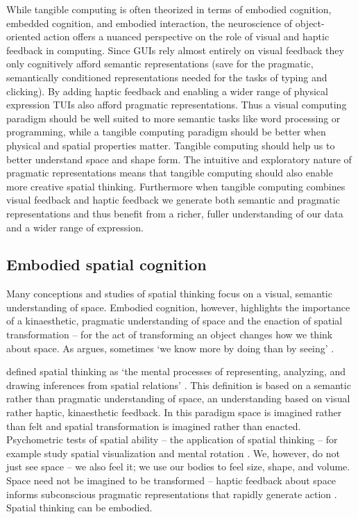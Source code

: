 \documentclass{article}
\begin{document}
While tangible computing is often theorized in terms of embodied cognition, embedded cognition, and embodied interaction,
the neuroscience of object-oriented action offers a nuanced perspective on the role of visual and haptic feedback in computing.
Since GUIs rely almost entirely on visual feedback they only cognitively afford semantic representations (save for the pragmatic, semantically conditioned representations needed for the tasks of typing and clicking). 
By adding haptic feedback and enabling a wider range of physical expression TUIs also afford pragmatic representations. 
Thus a visual computing paradigm should be well suited to more semantic tasks like word processing or programming, while a tangible computing paradigm should be better 
when physical and spatial properties matter. 
Tangible computing should help us to better understand space and shape form. 
The intuitive and exploratory nature of pragmatic representations means that tangible computing should also enable more creative spatial thinking. 
Furthermore when tangible computing combines visual feedback and haptic feedback
we generate both semantic and pragmatic representations and thus benefit from a richer, fuller understanding of our data and a wider range of expression.

\subsection{Embodied spatial cognition}
Many conceptions and studies of spatial thinking focus on a visual, semantic understanding of space. 
Embodied cognition, however, highlights the importance of a kinaesthetic, pragmatic understanding of space
and the enaction of spatial transformation -- for the act of transforming an object changes how we think about space. 
As \citeauthor{Kirsh2013} argues, sometimes `we know more by doing than by seeing' \citeyearpar{Kirsh2013}.

\citeauthor{Uttal2013} defined spatial thinking as 
`the mental processes of representing, analyzing, and drawing inferences from spatial relations' \citeyearpar{Uttal2013}. 
This definition is based on a semantic rather than pragmatic understanding of space, an understanding based on visual rather haptic, kinaesthetic feedback. 
In this paradigm space is imagined rather than felt and spatial transformation is imagined rather than enacted. 
Psychometric tests of spatial ability -- the application of spatial thinking -- for example study spatial visualization and mental rotation \citep{Uttal2013,Uttal2013a,Ormand2014}.
We, however, do not just see space -- we also feel it; we use our bodies to feel size, shape, and volume. 
Space need not be imagined to be transformed -- haptic feedback about space informs subconscious pragmatic representations that rapidly generate action \citep{Jeannerod1997}. Spatial thinking can be embodied.
\end{document}
